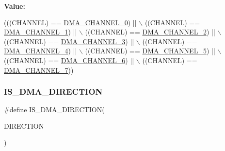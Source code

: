 {\bfseries Value\+:}
\begin{DoxyCode}
(((CHANNEL) == \hyperlink{group___d_m_a___channel__selection_gabd7de138931e93a90fc6c4eab5916bbe}{DMA\_CHANNEL\_0}) || \(\backslash\)
                                 ((CHANNEL) == \hyperlink{group___d_m_a___channel__selection_ga283364370e9876af6406b9fa70e2944f}{DMA\_CHANNEL\_1}) || \(\backslash\)
                                 ((CHANNEL) == \hyperlink{group___d_m_a___channel__selection_ga9688f3e78cbc2109d214b7ca049e22df}{DMA\_CHANNEL\_2}) || \(\backslash\)
                                 ((CHANNEL) == \hyperlink{group___d_m_a___channel__selection_gac689673fec4d72ede49a0d657e3a7e70}{DMA\_CHANNEL\_3}) || \(\backslash\)
                                 ((CHANNEL) == \hyperlink{group___d_m_a___channel__selection_ga51b51f5b39e23b28ad99520ad5be596f}{DMA\_CHANNEL\_4}) || \(\backslash\)
                                 ((CHANNEL) == \hyperlink{group___d_m_a___channel__selection_gafbaa82f3cff89858e50363c04ed0cca0}{DMA\_CHANNEL\_5}) || \(\backslash\)
                                 ((CHANNEL) == \hyperlink{group___d_m_a___channel__selection_gad23679661d8da3bc1aaacc62f99821f7}{DMA\_CHANNEL\_6}) || \(\backslash\)
                                 ((CHANNEL) == \hyperlink{group___d_m_a___channel__selection_ga77ff4e8675a3991feb20e385242f34ab}{DMA\_CHANNEL\_7}))
\end{DoxyCode}
\mbox{\label{group___d_m_a___private___macros_gae2b02e8e823854bcd7c5746cdd29e70d}} 
\subsubsection{\texorpdfstring{I\+S\+\_\+\+D\+M\+A\+\_\+\+D\+I\+R\+E\+C\+T\+I\+ON}{IS\_DMA\_DIRECTION}}
{\footnotesize\ttfamily \#define I\+S\+\_\+\+D\+M\+A\+\_\+\+D\+I\+R\+E\+C\+T\+I\+ON(\begin{DoxyParamCaption}\item[{}]{D\+I\+R\+E\+C\+T\+I\+ON }\end{DoxyParamCaption})}

